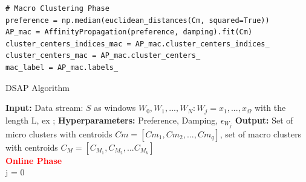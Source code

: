 \begin{lstlisting}
# Macro Clustering Phase
preference = np.median(euclidean_distances(Cm, squared=True))
AP_mac = AffinityPropagation(preference, damping).fit(Cm)
cluster_centers_indices_mac = AP_mac.cluster_centers_indices_
cluster_centers_mac = AP_mac.cluster_centers_
mac_label = AP_mac.labels_

\end{lstlisting}



\begin{algorithm}[htbp]
       
\caption{DSAP Algorithm}
    \label{algSDAPi}
\small
    \textbf{Input:}
         Data stream: $S$ as windows ${ W_0,W_1, ..., W_N : W_j = x_1, ..., x_{\Omega}}$ with the length L, ex ;\newline 
    \textbf{Hyperparameters:}
        {Preference, Damping, $\epsilon_{W_j}$}\newline
        \textbf{Output:}
        Set of micro clusters with centroids $Cm= [Cm_1,Cm_2, ..., Cm_q]$,  set of macro clusters with centroids $C_M= [C_{M_1}, C_{M_2}, ...C_{M_k}]$ \\
        
         \Statex  \hfill              
         \ContinuedFloat\hfill
        \textcolor{red}{\textbf{Online Phase}}\\
         j = 0\\
\end{algorithm}
